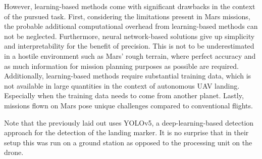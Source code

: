 However, learning-based methods come with significant drawbacks in the context of the pursued task. First, considering the limitations present in Mars missions, the probable additional computational overhead from learning-based methods can not be neglected. Furthermore, neural network-based solutions give up simplicity and interpretability for the benefit of precision. This is not to be underestimated in a hostile environment such as Mars' rough terrain, where perfect accuracy and as much information for mission planning purposes as possible are required. Additionally, learning-based methods require substantial training data, which is not available in large quantities in the context of autonomous UAV landing. Especially when the training data needs to come from another planet. Lastly, missions flown on Mars pose unique challenges compared to conventional flights. 

Note that the previously laid out \citet{Mu2023VisionBasedLanding} uses YOLOv5, a deep-learning-based detection approach for the detection of the landing marker. It is no surprise that in their setup this was run on a ground station as opposed to the processing unit on the drone.
